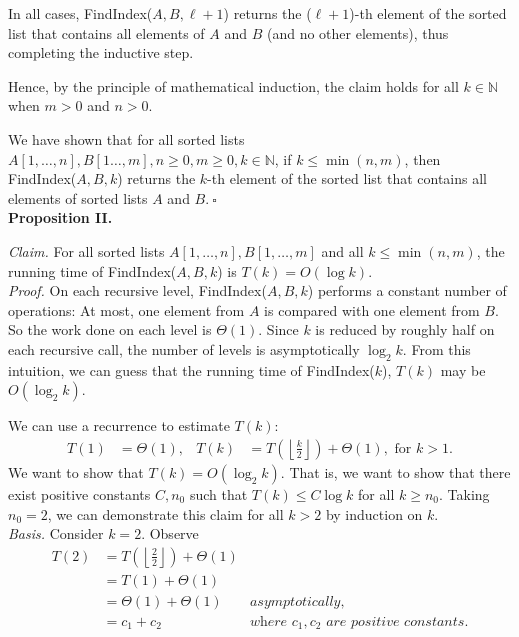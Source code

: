 \begin{solution}
\begin{itemize}
In all cases, {\sc FindIndex}($A,B,\ell+1$) returns the ($\ell+1$)-th element of the sorted list that contains all elements of $A$ and $B$ (and no other elements), thus completing the inductive step.

Hence, by the principle of mathematical induction, the claim holds for all $k\in\mathbb{N}$ when $m>0$ and $n>0$.
\end{itemize}

\noindent We have shown that for all sorted lists $A[1,\dots,n],B[1\dots,m],n\geq 0,m\geq 0,k\in\mathbb{N}$, if $k\leq\min(n,m)$, then {\sc FindIndex}($A,B,k$) returns the $k$-th element of the sorted list that contains all elements of sorted lists $A$ and $B$.$~\square$\\

\noindent\textbf{Proposition II.}

\noindent\textit{Claim. }For all sorted lists $A[1,\dots,n],B[1,\dots,m]$ and all $k\leq\min(n,m)$, the running time of {\sc FindIndex}($A,B,k$) is $T(k)=O(\log{k})$.\\

\noindent\textit{Proof. }On each recursive level, {\sc FindIndex}($A,B,k$) performs a constant number of operations: At most, one element from $A$ is compared with one element from $B$. So the work done on each level is $\Theta(1)$. Since $k$ is reduced by roughly half on each recursive call, the number of levels is asymptotically $\log_2k$. From this intuition, we can guess that the running time of {\sc FindIndex}($k$), $T(k)$ may be $O(\log_2k)$. 

We can use a recurrence to estimate $T(k)$:
\begin{align*}
T(1)&=\Theta(1),&
T(k)&=T\left(\left\lfloor\frac{k}{2}\right\rfloor\right)+\Theta(1),
\text{ for }k>1.
\end{align*}
We want to show that $T(k)=O(\log_2k)$. That is, we want to show that there exist positive constants $C,n_0$ such that $T(k)\leq C\log{k}$ for all $k\geq n_0$. Taking $n_0=2$, we can demonstrate this claim for all $k>2$ by induction on $k$.\\

\noindent\textit{Basis. }Consider $k=2$. Observe
\begin{align*}
T(2)&=T\left(\left\lfloor\frac{2}{2}\right\rfloor\right)+\Theta(1)\\
&=T(1)+\Theta(1)\\
&=\Theta(1)+\Theta(1)&\textit{asymptotically,}\\
&=c_1+c_2&\textit{where $c_1,c_2$ are positive constants.}
\end{align*}


\end{solution}

